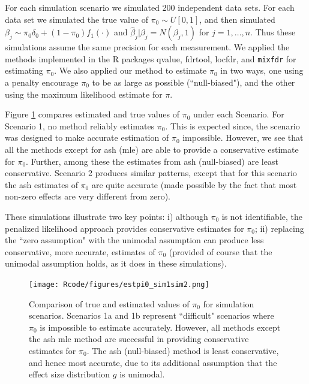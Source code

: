 \documentclass[11pt]{article}
\def\bhat{\hat{\beta}}
\def\mixfdr{{\tt mixfdr}\xspace}
\begin{document}
For each simulation scenario we simulated 200 independent data sets. For each data set we simulated
the true value of $\pi_0  \sim U[0,1]$, and then simulated $\beta_j \sim \pi_0 \delta_0 + (1-\pi_0) f_1(\cdot)$
and $\bhat_j | \beta_j = N(\beta_j,1)$ for $j=1,\dots,n$. Thus these simulations assume the same
precision for each measurement. We applied the methods implemented in the R packages qvalue, fdrtool, locfdr, and \mixfdr
for estimating $\pi_0$. We also applied our method to estimate $\pi_0$ in two ways, one using a penalty encourage
$\pi_0$ to be as large as possible (``null-biased"), and the other using the maximum likelihood estimate for $\pi$.


Figure \ref{fig:pi0} compares estimated and true values of $\pi_0$ under each Scenario. 
For Scenario 1, no method reliably estimates $\pi_0$. This is expected since, the scenario was designed to make accurate estimation
of $\pi_0$ impossible. However, we see that all the methods except for ash (mle) are able to provide a conservative
estimate for $\pi_0$. Further, among these the estimates from ash (null-biased) are least conservative. Scenario 2 produces similar patterns,
except that for this scenario the ash estimates of $\pi_0$ are quite accurate (made possible by the fact that most non-zero effects
are very different from zero).

These simulations illustrate two key points: i) although $\pi_0$ is not identifiable, the penalized likelihood approach
provides conservative estimates for $\pi_0$; ii) replacing the ``zero assumption" with the unimodal assumption can produce
less conservative, more accurate, estimates of $\pi_0$ (provided of course that the unimodal assumption holds, as it does in these simulations).

\begin{figure}[!ht] \label{fig:pi0}
\begin{center}
\texttt{[image: Rcode/figures/estpi0\_sim1sim2.png]}
\end{center}
\caption{Comparison of true and estimated values of $\pi_0$ for simulation scenarios. Scenarios 1a and 1b represent ``difficult" scenarios where $\pi_0$ is impossible to estimate accurately. However, all methods except the ash mle method are successful in providing conservative estimates for $\pi_0$. The ash (null-biased) method is least conservative, and hence most accurate, due to its additional assumption that the effect size distribution $g$ is unimodal.}
\end{figure}
\end{document}
